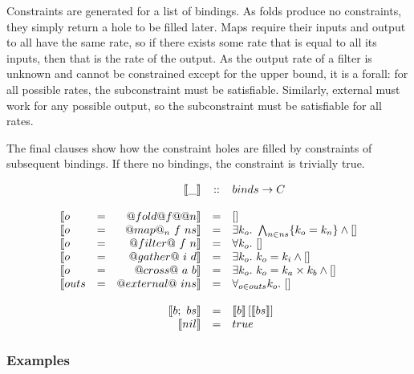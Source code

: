 Constraints are generated for a list of bindings.
As folds produce no constraints, they simply return a hole to be filled later.
Maps require their inputs and output to all have the same rate, so if there exists some rate that is equal to all its inputs, then that is the rate of the output.
As the output rate of a filter is unknown and cannot be constrained except for the upper bound, it is a forall: for all possible rates, the subconstraint must be satisfiable.
Similarly, external must work for any possible output, so the subconstraint must be satisfiable for all rates.

The final clauses show how the constraint holes are filled by constraints of subsequent bindings.
If there no bindings, the constraint is trivially true.

$$\begin{array}{lcrcl}
&&\constr{\_} & :: & binds \rightarrow C \\
\\

\constr{o &=& @fold @f@ @n}       &  = &  \hole \\
\constr{o &=& @map@_n~f~ns}       &  = &  \exists k_o.\ \bigwedge_{n \in ns}\{k_o = k_n\} \wedge \hole \\
\constr{o &=& @filter@~f~n}       &  = &  \forall k_o.\ \hole \\
\constr{o &=& @gather@~i~d}       &  = &  \exists k_o.\ k_o = k_i \wedge \hole \\
\constr{o &=& @cross@~a~b}        &  = &  \exists k_o.\ k_o = k_a \times k_b \wedge \hole \\
\constr{outs &=& @external@~ins}  &  = &  \forall_{o \in outs} k_o.\ \hole \\
\\
&&\constr{b;~bs}  &  = &  \fillhole{\constr{b}}{\constr{bs}}       \\
&&\constr{nil}    &  = &  true                          \\
\end{array}$$

\subsubsection{Examples}

